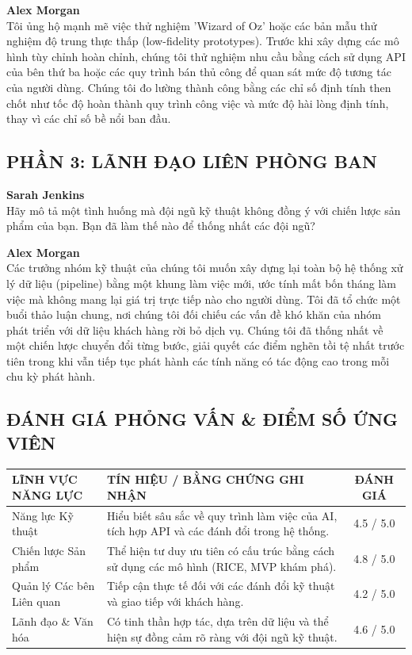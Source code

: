 \vspace{0.5em}
\noindent\textbf{Alex Morgan} \\
Tôi ủng hộ mạnh mẽ việc thử nghiệm 'Wizard of Oz' hoặc các bản mẫu thử nghiệm độ trung thực thấp (low-fidelity prototypes). Trước khi xây dựng các mô hình tùy chỉnh hoàn chỉnh, chúng tôi thử nghiệm nhu cầu bằng cách sử dụng API của bên thứ ba hoặc các quy trình bán thủ công để quan sát mức độ tương tác của người dùng. Chúng tôi đo lường thành công bằng các chỉ số định tính then chốt như tốc độ hoàn thành quy trình công việc và mức độ hài lòng định tính, thay vì các chỉ số bề nổi ban đầu.

\subsection*{PHẦN 3: LÃNH ĐẠO LIÊN PHÒNG BAN}

\noindent\textbf{Sarah Jenkins} \\
Hãy mô tả một tình huống mà đội ngũ kỹ thuật không đồng ý với chiến lược sản phẩm của bạn. Bạn đã làm thế nào để thống nhất các đội ngũ?

\vspace{0.5em}
\noindent\textbf{Alex Morgan} \\
Các trưởng nhóm kỹ thuật của chúng tôi muốn xây dựng lại toàn bộ hệ thống xử lý dữ liệu (pipeline) bằng một khung làm việc mới, ước tính mất bốn tháng làm việc mà không mang lại giá trị trực tiếp nào cho người dùng. Tôi đã tổ chức một buổi thảo luận chung, nơi chúng tôi đối chiếu các vấn đề khó khăn của nhóm phát triển với dữ liệu khách hàng rời bỏ dịch vụ. Chúng tôi đã thống nhất về một chiến lược chuyển đổi từng bước, giải quyết các điểm nghẽn tồi tệ nhất trước tiên trong khi vẫn tiếp tục phát hành các tính năng có tác động cao trong mỗi chu kỳ phát hành.

\subsection*{ĐÁNH GIÁ PHỎNG VẤN \& ĐIỂM SỐ ỨNG VIÊN}

\begin{table}[h!]
\centering
\begin{tabular}{|l|p{8cm}|c|}
\hline
\textbf{LĨNH VỰC NĂNG LỰC} & \textbf{TÍN HIỆU / BẰNG CHỨNG GHI NHẬN} & \textbf{ĐÁNH GIÁ} \\ \hline
Năng lực Kỹ thuật & Hiểu biết sâu sắc về quy trình làm việc của AI, tích hợp API và các đánh đổi trong hệ thống. & 4.5 / 5.0 \\ \hline
Chiến lược Sản phẩm & Thể hiện tư duy ưu tiên có cấu trúc bằng cách sử dụng các mô hình (RICE, MVP khám phá). & 4.8 / 5.0 \\ \hline
Quản lý Các bên Liên quan & Tiếp cận thực tế đối với các đánh đổi kỹ thuật và giao tiếp với khách hàng. & 4.2 / 5.0 \\ \hline
Lãnh đạo \& Văn hóa & Có tinh thần hợp tác, dựa trên dữ liệu và thể hiện sự đồng cảm rõ ràng với đội ngũ kỹ thuật. & 4.6 / 5.0 \\ \hline
\end{tabular}
\end{table}

